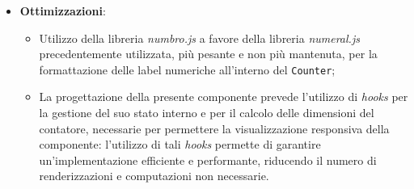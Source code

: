 \begin{itemize}
            (ovvero la selezione) delle informazioni \textit{data, options} e \textit{visualizationName}.
            \begin{listing}[H]
                  \begin{verbatim}
                  export function Counter({
                        data,
                        options,
                        visualizationName,
                        }: Pick<RendererProps, 
                              'data' 
                              | 'options' 
                              | 'visualizationName'>);
                  \end{verbatim}
                  \caption{Definizione delle \textit{props} della componente \texttt{Counter}}
                  \label{listing:counterProps}
            \end{listing}
      \item \textbf{Ottimizzazioni}:
            \begin{itemize}
                  \item Utilizzo della libreria \textit{numbro.js} a favore della libreria \textit{numeral.js} precedentemente utilizzata, più pesante e non più mantenuta,
                        per la formattazione delle label numeriche all'interno del \texttt{Counter};
                  \item La progettazione della presente componente prevede l'utilizzo di \textit{hooks} per la gestione del suo stato interno e per il calcolo delle dimensioni
                        del contatore, necessarie per permettere la visualizzazione responsiva della componente: l'utilizzo di tali \textit{hooks} permette di garantire
                        un'implementazione efficiente e performante, riducendo il numero di renderizzazioni e computazioni non necessarie.
            \end{itemize}
\end{itemize}

